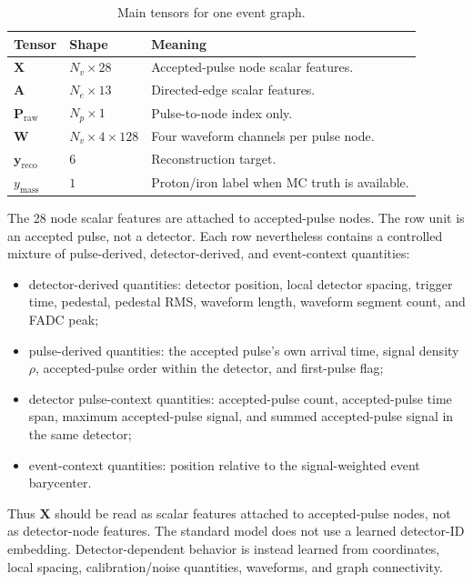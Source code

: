 \documentclass[a4paper,10pt]{article}
\begin{document}
\begin{table}[htbp]
  \centering
  \caption{Main tensors for one event graph.}
  \label{tab:tensors}
  \begin{tabular}{lll}
    \toprule
    Tensor & Shape & Meaning \\
    \midrule
    $\mathbf{X}$ & $N_v\times28$ & Accepted-pulse node scalar features. \\
    $\mathbf{A}$ & $N_e\times13$ & Directed-edge scalar features. \\
    $\mathbf{P}_{\mathrm{raw}}$ & $N_p\times1$ & Pulse-to-node index only. \\
    $\mathbf{W}$ & $N_v\times4\times128$ & Four waveform channels per pulse node. \\
    $\mathbf{y}_{\mathrm{reco}}$ & $6$ & Reconstruction target. \\
    $y_{\mathrm{mass}}$ & $1$ & Proton/iron label when MC truth is available. \\
    \bottomrule
  \end{tabular}
\end{table}

The 28 node scalar features are attached to accepted-pulse nodes.
The row unit is an accepted pulse, not a detector.
Each row nevertheless contains a controlled mixture of pulse-derived, detector-derived, and event-context quantities:
\begin{itemize}
  \item detector-derived quantities: detector position, local detector spacing, trigger time, pedestal, pedestal RMS, waveform length, waveform segment count, and FADC peak;
  \item pulse-derived quantities: the accepted pulse's own arrival time, signal density $\rho$, accepted-pulse order within the detector, and first-pulse flag;
  \item detector pulse-context quantities: accepted-pulse count, accepted-pulse time span, maximum accepted-pulse signal, and summed accepted-pulse signal in the same detector;
  \item event-context quantities: position relative to the signal-weighted event barycenter.
\end{itemize}
Thus $\mathbf{X}$ should be read as scalar features attached to accepted-pulse nodes, not as detector-node features.
The standard model does not use a learned detector-ID embedding.
Detector-dependent behavior is instead learned from coordinates, local spacing, calibration/noise quantities, waveforms, and graph connectivity.
\end{document}
